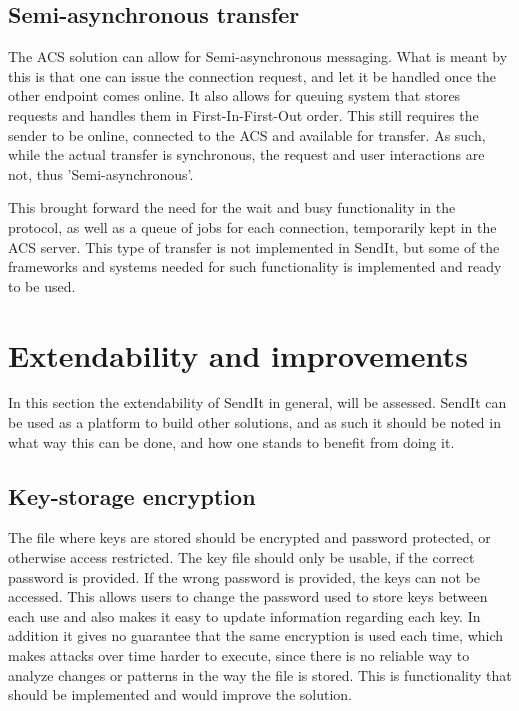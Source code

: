 	\subsection{Semi-asynchronous transfer}
	The ACS solution can allow for Semi-asynchronous messaging. What is meant by this is that one can issue the connection request, and let it be handled once the other endpoint comes online. It also allows for queuing system that stores requests and handles them in First-In-First-Out order. This still requires the sender to be online, connected to the ACS and available for transfer. As such, while the actual transfer is synchronous, the request and user interactions are not, thus 'Semi-asynchronous'.

	This brought forward the need for the wait and busy functionality in the protocol, as well as a queue of jobs for each connection, temporarily kept in the ACS server. This type of transfer is not implemented in SendIt, but some of the frameworks and systems needed for such functionality is implemented and ready to be used.


\section{Extendability and improvements}
%
In this section the extendability of SendIt in general, will be assessed. SendIt can be used as a platform to build other solutions, and as such it should be noted in what way this can be done, and how one stands to benefit from doing it.

	\subsection{Key-storage encryption}
	The file where keys are stored should be encrypted and password protected, or otherwise access restricted. The key file should only be usable, if the correct password is provided. If the wrong password is provided, the keys can not be accessed. This allows users to change the password used to store keys between each use and also makes it easy to update information regarding each key. In addition it gives no guarantee that the same encryption is used each time, which makes attacks over time harder to execute, since there is no reliable way to analyze changes or patterns in the way the file is stored. This is functionality that should be implemented and would improve the solution.

